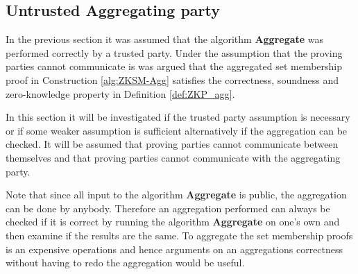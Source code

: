 


\subsection*{Untrusted Aggregating party }
In the previous section it was assumed that the algorithm \textbf{Aggregate} was performed correctly by a trusted party. Under the assumption that the proving parties cannot communicate is was argued that the aggregated set membership proof in Construction \ref{alg:ZKSM-Agg} satisfies the correctness, soundness and zero-knowledge property  in Definition \ref{def:ZKP_agg}.

In this section it will be investigated if the trusted party assumption is necessary or if some weaker assumption is sufficient alternatively if the aggregation can be checked. It will be assumed that proving parties cannot communicate between themselves and that proving parties cannot communicate with the aggregating party. 

Note that since all input to the algorithm \textbf{Aggregate} is public, the aggregation can be done by anybody. Therefore an aggregation performed can always be checked if it is correct by running the algorithm \textbf{Aggregate} on one's own and then examine if the results are the same. To aggregate the set membership proofs is an expensive operations and hence arguments on an aggregations correctness without having to redo the aggregation would be useful.


